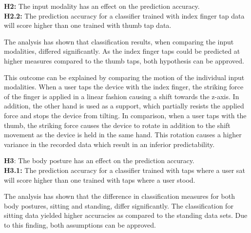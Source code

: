 \begin{center}
  \begin{framed}
    \textbf{H2:} The input modality has an effect on the prediction accuracy.\\
    \textbf{H2.2:} The prediction accuracy for a classifier trained with index finger tap data will score higher than one trained with thumb tap data.
  \end{framed}
\end{center}

The analysis has shown that classification results, when comparing the input modalities, differed significantly. As the index finger taps could be predicted at higher measures compared to the thumb taps, both hypothesis can be approved.

This outcome can be explained by comparing the motion of the individual input modalities. When a user taps the device with the index finger, the striking force of the finger is applied in a linear fashion causing a shift towards the z-axis. In addition, the other hand is used as a support, which partially resists the applied force and stops the device from tilting. In comparison, when a user taps with the thumb, the striking force causes the device to rotate in addition to the shift movement as the device is held in the same hand. This rotation causes a higher variance in the recorded data which result in an inferior predictability.



\begin{center}
  \begin{framed}
    \textbf{H3}: The body posture has an effect on the prediction accuracy.\\
    \textbf{H3.1:} The prediction accuracy for a classifier trained with taps where a user sat will score higher than one trained with taps where a user stood.
  \end{framed}
\end{center}

The analysis has shown that the difference in classification measures for both body postures, sitting and standing, differ significantly. The classification for sitting data yielded higher accuracies as compared to the standing data sets. Due to this finding, both assumptions can be approved. 

